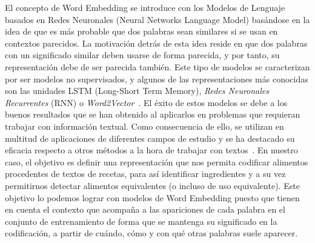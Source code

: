 El concepto de Word Embedding se introduce con los Modelos de Lenguaje basados en Redes Neuronales (Neural Networks Language Model) basándose en la idea de que es más probable que dos palabras sean similares si se usan en contextos parecidos. La motivación detrás de esta idea reside en que dos palabras con un significado similar deben usarse de forma parecida, y por tanto, su representación debe de ser parecida también. Este tipo de modelos se caracterizan por ser modelos no supervisados, y algunos de las representaciones más conocidas son las unidades LSTM (Long-Short Term Memory), \textit{Redes Neuronales Recurrentes} (RNN) o \textit{Word2Vector}~\cite{li2018word}. El éxito de estos modelos se debe a los buenos resultados que se han obtenido al aplicarlos en problemas que requieran trabajar con información textual. Como consecuencia de ello, se utilizan en multitud de aplicaciones de diferentes campos de estudio y se ha destacado su eficacia respecto a otros métodos a la hora de trabajar con textos~\cite{indefense}. En nuestro caso, el objetivo es definir una representación que nos permita codificar alimentos procedentes de textos de recetas, para así identificar ingredientes y a su vez permitirnos detectar alimentos equivalentes (o incluso de uso equivalente). Este objetivo lo podemos lograr con modelos de Word Embedding puesto que tienen en cuenta el contexto que acompaña a las apariciones de cada palabra en el conjunto de entrenamiento de forma que se mantenga su significado en la codificación, a partir de cuándo, cómo y con qué otras palabras suele aparecer.


